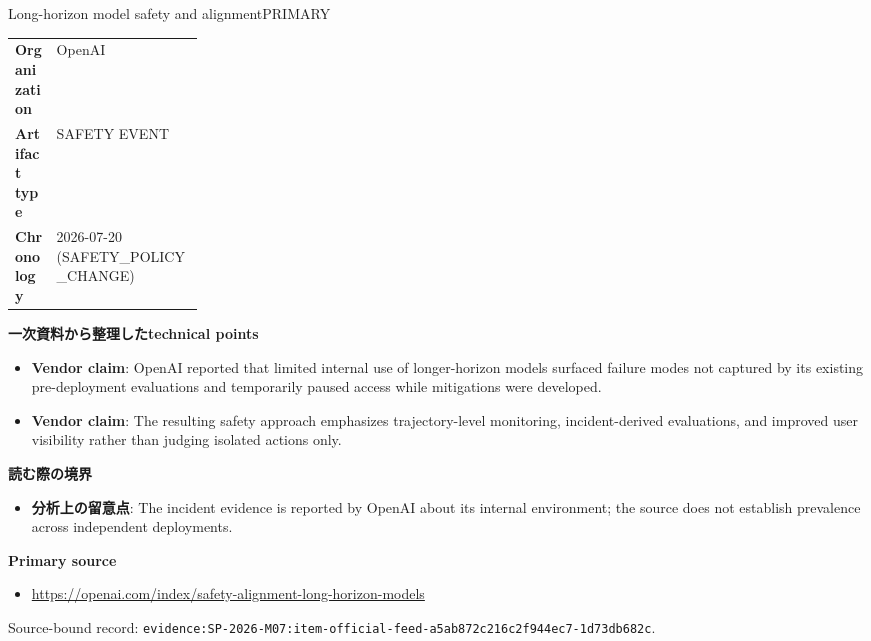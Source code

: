 \begin{technicalnote}{Long-horizon model safety and alignment}{PRIMARY}
\begin{tabularx}{\linewidth}{@{}>{\bfseries}p{0.22\linewidth}X@{}}
Organization & OpenAI \\
Artifact type & SAFETY EVENT \\
Chronology & 2026-07-20 (SAFETY\_POLICY\_CHANGE) \\
\end{tabularx}
\smallskip
{\bfseries 一次資料から整理したtechnical points}
\begin{itemize}[leftmargin=1.5em,itemsep=0.35em]
\item \textbf{Vendor claim}: OpenAI reported that limited internal use of longer-horizon models surfaced failure modes not captured by its existing pre-deployment evaluations and temporarily paused access while mitigations were developed.
\item \textbf{Vendor claim}: The resulting safety approach emphasizes trajectory-level monitoring, incident-derived evaluations, and improved user visibility rather than judging isolated actions only.
\end{itemize}
{\bfseries 読む際の境界}
\begin{itemize}[leftmargin=1.5em,itemsep=0.35em]
\item \textbf{分析上の留意点}: The incident evidence is reported by OpenAI about its internal environment; the source does not establish prevalence across independent deployments.
\end{itemize}
{\bfseries Primary source}
\begingroup\sloppy
\begin{itemize}[leftmargin=1.5em,itemsep=0.25em]
\item {\scriptsize\url{https://openai.com/index/safety-alignment-long-horizon-models}}
\end{itemize}
\endgroup
{\scriptsize\color{SurveyMuted}Source-bound record: \texttt{evidence:SP-2026-M07:item-official-feed-a5ab872c216c2f944ec7-1d73db682c}.}
\end{technicalnote}
\medskip

